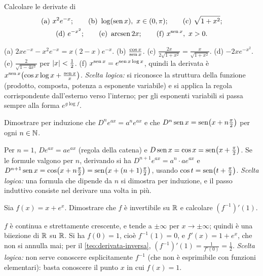 \begin{esercizio}\label{es:derivate-calcolo}
Calcolare le derivate di
\begin{gather*}
  \text{(a) } x^{2}e^{-x};\qquad \text{(b) } \log(\sen x),\ x\in(0,\pi);\qquad
  \text{(c) } \sqrt{1+x^{2}};\\
  \text{(d) } e^{-x^{2}};\qquad \text{(e) } \arcsen2x;\qquad \text{(f) } x^{\sen x},\ x>0.
\end{gather*}
\begin{soluzione}
(a) $2xe^{-x}-x^{2}e^{-x}=x(2-x)e^{-x}$. (b) $\frac{\cos x}{\operatorname{sen} x}$. (c)
$\frac{2x}{2\sqrt{1+x^{2}}}=\frac{x}{\sqrt{1+x^{2}}}$. (d) $-2xe^{-x^{2}}$. (e)
$\frac{2}{\sqrt{1-4x^{2}}}$ per $\lvert x\rvert<\frac12$. (f) $x^{\operatorname{sen} x}=e^{\operatorname{sen} x\log x}$, quindi la
derivata è $x^{\operatorname{sen} x}\bigl(\cos x\log x+\frac{\operatorname{sen} x}x\bigr)$. \emph{Scelta logica:} si
riconosce la struttura della funzione (prodotto, composta, potenza a esponente variabile)
e si applica la regola corrispondente dall'esterno verso l'interno; per gli esponenti
variabili si passa sempre alla forma $e^{g\log f}$.
\end{soluzione}
\end{esercizio}

\begin{esercizio}
Dimostrare per induzione che $D^{n}e^{ax}=a^{n}e^{ax}$ e che
$D^{n}\operatorname{sen} x=\operatorname{sen}\bigl(x+n\frac\pi2\bigr)$ per ogni $n\in\mathbb{N}$.
\begin{soluzione}
Per $n=1$, $De^{ax}=ae^{ax}$ (regola della catena) e
$D\operatorname{sen} x=\cos x=\operatorname{sen}\bigl(x+\frac\pi2\bigr)$. Se le formule valgono per $n$, derivando si ha
$D^{n+1}e^{ax}=a^{n}\cdot ae^{ax}$ e
$D^{n+1}\operatorname{sen} x=\cos\bigl(x+n\frac\pi2\bigr)=\operatorname{sen}\bigl(x+(n+1)\frac\pi2\bigr)$, usando
$\cos t=\operatorname{sen}\bigl(t+\frac\pi2\bigr)$. \emph{Scelta logica:} una formula che dipende da $n$
si dimostra per induzione, e il passo induttivo consiste nel derivare una volta in più.
\end{soluzione}
\end{esercizio}

\begin{esercizio}
Sia $f(x)=x+e^{x}$. Dimostrare che $f$ è invertibile su $\mathbb{R}$ e calcolare $(f^{-1})'(1)$.
\begin{soluzione}
$f$ è continua e strettamente crescente, e tende a $\pm\infty$ per $x\to\pm\infty$; quindi
è una biiezione di $\mathbb{R}$ su $\mathbb{R}$. Si ha $f(0)=1$, cioè $f^{-1}(1)=0$, e $f'(x)=1+e^{x}$, che
non si annulla mai; per il \cref{teo:derivata-inversa},
$(f^{-1})'(1)=\frac1{f'(0)}=\frac12$. \emph{Scelta logica:} non serve conoscere
esplicitamente $f^{-1}$ (che non è esprimibile con funzioni elementari): basta conoscere il
punto $x$ in cui $f(x)=1$.
\end{soluzione}
\end{esercizio}

